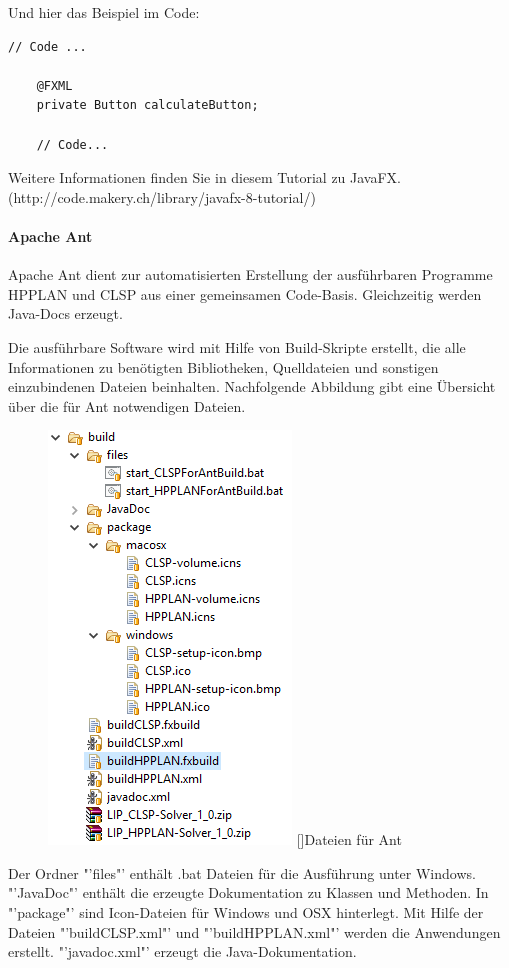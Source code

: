 \documentclass[12pt,a4paper, listof=entryprefix, bibliography=totocnumbered,toc=listofnumbered,lof=listofnumbered]{scrartcl}
\begin{document}
Und hier das Beispiel im Code:
\begin{lstlisting}[caption= Beispielprogramm, label=lst:code]
	// Code ...
	
	@FXML
	private Button calculateButton; 
	
	// Code...
\end{lstlisting}

Weitere Informationen finden Sie in diesem Tutorial zu JavaFX.
\\
(http://code.makery.ch/library/javafx-8-tutorial/)

\paragraph{Apache Ant}
Apache Ant dient zur automatisierten Erstellung der ausführbaren Programme HPPLAN und CLSP aus einer gemeinsamen Code-Basis. Gleichzeitig werden Java-Docs erzeugt. 

Die ausführbare Software wird mit Hilfe von Build-Skripte erstellt, die alle Informationen zu benötigten Bibliotheken, Quelldateien und sonstigen einzubindenen Dateien beinhalten. Nachfolgende Abbildung gibt eine Übersicht über die für Ant notwendigen Dateien.

\begin{figure}[H]
	\centering
	\includegraphics[]{images/antBuild.png} 
	[]{Dateien für Ant}
	\label{fig:antBuild}
\end{figure}

Der Ordner "'files"' enthält .bat Dateien für die Ausführung unter Windows. "'JavaDoc"' enthält die erzeugte Dokumentation zu Klassen und Methoden. In "'package"' sind Icon-Dateien für Windows und OSX hinterlegt. Mit Hilfe der Dateien "'buildCLSP.xml"' und "'buildHPPLAN.xml"' werden die Anwendungen erstellt. "'javadoc.xml"' erzeugt die Java-Dokumentation.
\end{document}
